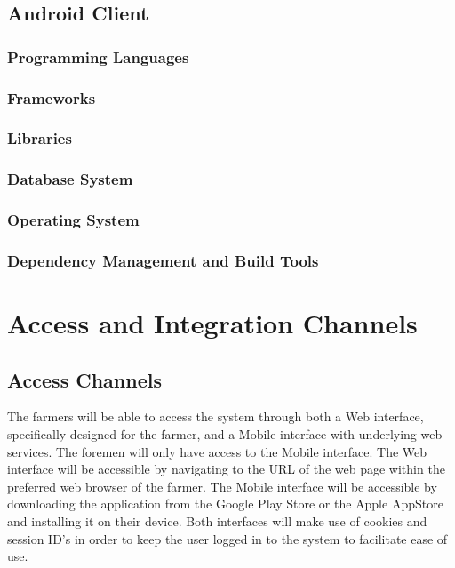 \documentclass[11pt,fleqn]{book} %
\begin{document}
	\section{Android Client}
	\subsection{Programming Languages}
	\subsection{Frameworks}
	\subsection{Libraries}
	\subsection{Database System}
	\subsection{Operating System}
	\subsection{Dependency Management and Build Tools}	
	
	
	
	
	\chapter{Access and Integration Channels}
	
	\section{Access Channels}
	
	The farmers will be able to access the system through both a Web interface, specifically designed for the farmer, and a Mobile interface with underlying web-services. The foremen will only have access to the Mobile interface. The Web interface will be accessible by navigating to the URL of the web page within the preferred web browser of the farmer. The Mobile interface will be accessible by downloading the application from the Google Play Store or the Apple AppStore and installing it on their device. Both interfaces will make use of cookies and session ID’s in order to keep the user logged in to the system to facilitate ease of use.
	
\end{document}
